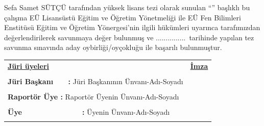 \thispagestyle{empty}
\vspace*{4cm}

Sefa Samet SÜTÇÜ tarafından yüksek lisans tezi olarak sunulan “\tezadi” başlıklı bu çalışma EÜ Lisansüstü Eğitim ve Öğretim Yönetmeliği ile EÜ Fen Bilimleri Enstitüsü Eğitim ve Öğretim Yönergesi’nin ilgili hükümleri uyarınca tarafımızdan değerlendirilerek savunmaya değer bulunmuş ve ...............\ tarihinde yapılan tez savunma sınavında aday oybirliği/oyçokluğu ile başarılı bulunmuştur.\\

\setcounter{page}{3}
\begin{tabular}{lr}
\textbf{\underline{Jüri üyeleri}} & \hspace{0.5cm}\textbf{\underline{İmza}}\\
  & \\
\textbf{Jüri Başkanı \ \ \ :} Jüri Başkanının Ünvanı-Adı-Soyadı & \\
\\
\textbf{Raportör Üye :} Raportör Üyenin Ünvanı-Adı-Soyadı & \\
\\
\textbf{Üye \ \ \ \ \ \ \ \ \ \ \ \ \ \ : } Üyenin Ünvanı-Adı-Soyadı & \\
\\
\end{tabular}

\bossayfa
